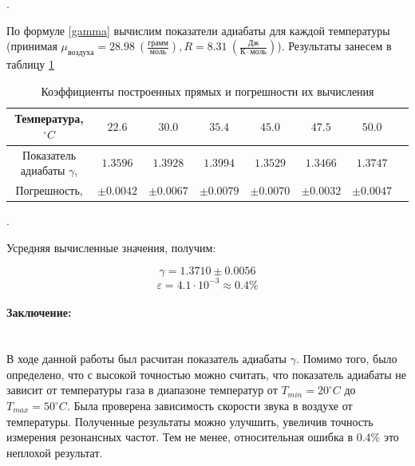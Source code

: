 \documentclass[a4paper, 12pt]{article}
\newcommand{\parag}[1]{\paragraph*{#1:}}
\newcounter{Points}
\newcommand{\point}{\arabic{Points}. \addtocounter{Points}{1}}
\begin{document}
\point По формуле \ref{gamma} вычислим показатели адиабаты для каждой температуры (принимая $\mu_{воздуха} = 28.98~\left(\frac{грамм}{моль}\right), R = 8.31~\left(\frac{Дж}{К \cdot моль}\right)$). Результаты занесем в таблицу \ref{tabl:gammas}

\begin{table}[h]
    \centering
    \small
    \setlength\tabcolsep{3pt}
    \begin{tabular}{|c|c|c|c|c|c|c|c|}
    \hline 
    Температура, $^\circ C$ & $22.6$ & $30.0$ & $35.4$ & $45.0$ & $47.5$ & $50.0$ \\ \hline
    Показатель адиабаты $\gamma$, & $1.3596$ & $1.3928$ & $1.3994$ & $1.3529$ & $1.3466$ & $1.3747$ \\ \hline
    Погрешность, & $\pm 0.0042$ & $\pm 0.0067$ & $\pm 0.0079$ & $\pm 0.0070$ & $\pm 0.0032$ & $\pm 0.0047$ \\ \hline
    \end{tabular}
	\caption{Коэффициенты построенных прямых и погрешности их вычисления}
    \label{tabl:gammas}
\end{table}

\point Усредняя вычисленные значения, получим:

$$\gamma = 1.3710 \pm 0.0056$$
$$\varepsilon = 4.1 \cdot 10^{-3} \approx 0.4\%$$

\parag {Заключение} ~\\
    В ходе данной работы был расчитан показатель адиабаты $\gamma$. Помимо того, было определено, что с высокой точностью можно считать, что показатель адиабаты не зависит от температуры газа в диапазоне температур от $T_{min} = 20^\circ C$ до $T_{max} = 50^\circ C$. Была проверена зависимость скорости звука в воздухе от температуры. Полученные результаты можно улучшить, увеличив точность измерения резонансных частот. Тем не менее, относительная ошибка в $0.4\%$ это неплохой результат.
\end{document}
